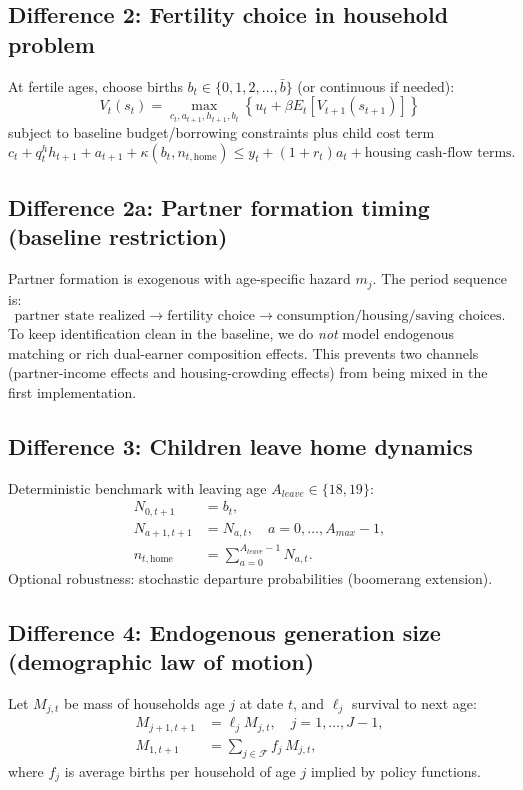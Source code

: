 \documentclass[11pt]{article}
\begin{document}
\subsection*{Difference 2: Fertility choice in household problem}
At fertile ages, choose births $b_t \in \{0,1,2,\dots,\bar b\}$ (or continuous if needed):
\begin{equation}
V_t(s_t)=\max_{c_t,a_{t+1},h_{t+1},b_t}\left\{u_t + \beta E_t[V_{t+1}(s_{t+1})]\right\}
\end{equation}
subject to baseline budget/borrowing constraints plus child cost term
\begin{equation}
\label{eq:child_cost}
 c_t + q_t^h h_{t+1} + a_{t+1} + \kappa(b_t,n_{t,\text{home}})
\le y_t + (1+r_t)a_t + \text{housing cash-flow terms}.
\end{equation}

\subsection*{Difference 2a: Partner formation timing (baseline restriction)}
Partner formation is exogenous with age-specific hazard \(m_j\). The period sequence is:
\[
\text{partner state realized} \rightarrow \text{fertility choice} \rightarrow \text{consumption/housing/saving choices}.
\]
To keep identification clean in the baseline, we do \emph{not} model endogenous matching or rich dual-earner composition effects. This prevents two channels (partner-income effects and housing-crowding effects) from being mixed in the first implementation.

\subsection*{Difference 3: Children leave home dynamics}
Deterministic benchmark with leaving age $A_{leave}\in\{18,19\}$:
\begin{align}
N_{0,t+1} &= b_t, \\
N_{a+1,t+1} &= N_{a,t}, \quad a=0,\dots,A_{max}-1, \\
n_{t,\text{home}} &= \sum_{a=0}^{A_{leave}-1}N_{a,t}.
\end{align}
Optional robustness: stochastic departure probabilities (boomerang extension).

\subsection*{Difference 4: Endogenous generation size (demographic law of motion)}
Let $M_{j,t}$ be mass of households age $j$ at date $t$, and $\ell_j$ survival to next age:
\begin{align}
M_{j+1,t+1} &= \ell_j M_{j,t}, \quad j=1,\dots,J-1, \\
M_{1,t+1} &= \sum_{j\in\mathcal F} f_j\,M_{j,t},
\end{align}
where $f_j$ is average births per household of age $j$ implied by policy functions.
\end{document}

